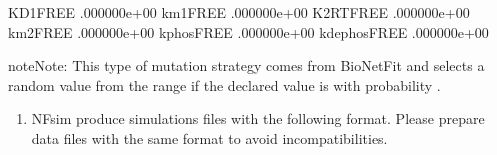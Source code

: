 \documentclass[letterpaper,10pt,english]{sphinxmanual}
\begin{document}
%
\begin{sphinxVerbatim}[commandchars=\\\{\}]
KD1\PYGZus{}\PYGZus{}FREE\PYGZus{}\PYGZus{}        .000000e+00 
km1\PYGZus{}\PYGZus{}FREE\PYGZus{}\PYGZus{}        .000000e+00 
K2RT\PYGZus{}\PYGZus{}FREE\PYGZus{}\PYGZus{}       .000000e+00 
km2\PYGZus{}\PYGZus{}FREE\PYGZus{}\PYGZus{}        .000000e+00 
kphos\PYGZus{}\PYGZus{}FREE\PYGZus{}\PYGZus{}      .000000e+00 
kdephos\PYGZus{}\PYGZus{}FREE\PYGZus{}\PYGZus{}    .000000e+00 
\end{sphinxVerbatim}

\begin{sphinxadmonition}{note}{Note:}
 This type of mutation strategy comes from BioNetFit and
selects a random value from the range 
if the declared value is  with probability .
\end{sphinxadmonition}
\begin{enumerate}
\def\theenumi{\arabic{enumi}}
\def\labelenumi{\theenumi .}
\makeatletter\def\p@enumii{\p@enumi \theenumi .}\makeatother
\setcounter{enumi}{1}
\item {} 

NFsim produce simulations files with the following format. Please prepare
data files with the same format to avoid incompatibilities.

\end{enumerate}
\end{document}

